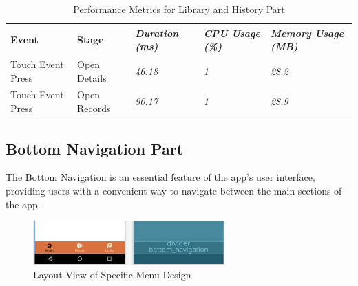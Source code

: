 \documentclass[conference,10pt,letterpaper]{IEEEtran}
\begin{document}
	\begin{table}[b]
		\centering
		\begin{tabularx}{6.2in}{|X|X|X|X|X|}
			\hline
			\textbf{Event} & \textbf{Stage} & \textbf{\textit{Duration (ms)}} & \textbf{\textit{CPU Usage (\%)}} & \textbf{\textit{Memory Usage (MB)}} \\ \hline
			Touch Event Press & Open Details  & \textit{46.18}  & \textit{1}            & \textit{28.2} \\ \hline
			Touch Event Press & Open Records  & \textit{90.17}  & \textit{1}            & \textit{28.9} \\ \hline
		\end{tabularx}
		\caption{Performance Metrics for Library and History Part}
		\label{tab:his_lib_performance}
	\end{table}
	
	\subsection{Bottom Navigation Part}
	
	The Bottom Navigation is an essential feature of the app's user interface, providing users with a convenient way to navigate between the main sections of the app.
	
	\begin{figure}[htbp]
		\centerline{\includegraphics[width=2.9in]{src/navigation bottom.png}}
		\caption{Layout View of Specific Menu Design}
		\label{fig:nav_bottom}
	\end{figure}
	
\end{document}
